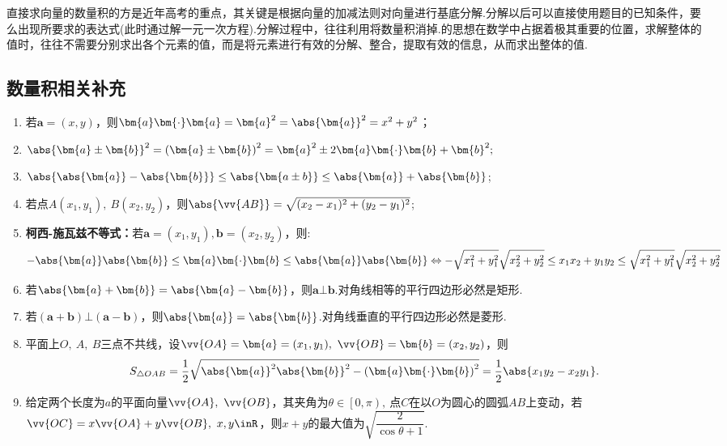     {\kaishu 直接求向量的数量积的方是近年高考的重点，其关键是根据向量的加减法则对向量进行基底分解.分解以后可以直接使用题目的已知条件，要么出现所要求的表达式(此时通过解一元一次方程).分解过程中，往往利用将数量积消掉.的思想在数学中占据着极其重要的位置，求解整体的值时，往往不需要分别求出各个元素的值，而是将元素进行有效的分解、整合，提取有效的信息，从而求出整体的值.}
  \subsection{数量积相关补充}
    \begin{enumerate}[(1)]
    \item 若$\bm{a}=\left(x,y\right)$，则$ \bm{a}\bm{\cdot}\bm{a}=\bm{a}^2=\abs{\bm{a}}^2=x^2+y^2 $；
    \item $ \abs{\bm{a}\pm \bm{b}}^2=\left(\bm{a}\pm \bm{b}\right)^2=\bm{a}^2\pm2\bm{a}\bm{\cdot}\bm{b}+\bm{b}^2 ;$
    \item $\abs{\abs{\bm{a}}-\abs{\bm{b}}}\le\abs{\bm{a\pm b}}\le\abs{\bm{a}}+\abs{\bm{b}}$;
    \item 若点$ A(x_1,y_1),~B(x_2,y_2) $，则$ \abs{\vv{AB}}=\sqrt{(x_2-x_1)^2+(y_2-y_1)^2} $;
    \item \textbf{柯西-施瓦兹不等式：}若$\bm{a}=\left(x_1,y_1\right),\bm{b}=\left(x_2,y_2\right)$，则:$$ -\abs{\bm{a}}\abs{\bm{b}}\le\bm{a}\bm{\cdot}\bm{b}\le\abs{\bm{a}}\abs{\bm{b}}\Leftrightarrow -\sqrt{x_1^2+y_1^2}\sqrt{x_2^2+y_2^2}\le x_1x_2+y_1y_2\le \sqrt{x_1^2+y_1^2}\sqrt{x_2^2+y_2^2}$$
    \item 若$ \abs{\bm{a}+\bm{b}}=\abs{\bm{a}-\bm{b}} $，则$ \bm{a}\bot\bm{b} $.对角线相等的平行四边形必然是矩形.
    \item 若$ \left(\bm{a}+\bm{b}\right)\bm{\bot}\left(\bm{a}-\bm{b}\right) $，则$\abs{\bm{a}}=\abs{\bm{b}} $.对角线垂直的平行四边形必然是菱形.
    \item 平面上$ O,~A,~B $三点不共线，设$\vv{OA}=\bm{a}=(x_1,y_1) ,~\vv{OB}=\bm{b}=(x_2,y_2)$，则$$ S_{\triangle OAB}=\dfrac{1}{2}\sqrt{\abs{\bm{a}}^2\abs{\bm{b}}^2-\left(\bm{a}\bm{\cdot}\bm{b}\right)^2}=\dfrac{1}{2}\abs{x_1y_2-x_2y_1} .$$
    \item 给定两个长度为$ a $的平面向量$ \vv{OA},~\vv{OB} $，其夹角为$ \theta\in\left[0,\pi \right), ~$点$ C $在以$ O $为圆心的圆弧$ AB $上变动，若$ \vv{OC}=x\vv{OA}+y\vv{OB},~x,y\inR $，则$ x+y $的最大值为$ \sqrt{\dfrac{2}{\cos\theta+1}}. $
    \end{enumerate}
